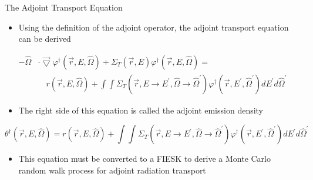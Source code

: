 \documentclass{beamer}
\begin{document}
\begin{frame}{The Adjoint Transport Equation}

  \begin{itemize}
    \item Using the definition of the adjoint operator, the adjoint transport 
      equation can be derived
  \end{itemize}
  
  \begin{equation*}
    \begin{split}
      -\hat{\Omega} &\cdot \vec{\bigtriangledown} 
      \varphi^{\dagger}(\vec{r},E,\hat{\Omega})
      + \Sigma_T(\vec{r},E) \varphi^{\dagger}(\vec{r},E,\hat{\Omega}) = \\
      & \quad r(\vec{r},E,\hat{\Omega}) +
      \int\int \Sigma_T(\vec{r},E \to E^{'},\hat{\Omega} \to \hat{\Omega}^{'})
      \varphi^{\dagger}(\vec{r},E^{'},\hat{\Omega}^{'}) dE^{'}d\hat{\Omega}^{'}
    \end{split}
  \end{equation*}

  \medskip

  \begin{itemize}
    \item The right side of this equation is called the adjoint emission density
  \end{itemize}
  \begin{equation*}
    \theta^{\dagger}(\vec{r},E,\hat{\Omega}) = r(\vec{r},E,\hat{\Omega}) +
    \int\int \Sigma_T(\vec{r},E \to E^{'},\hat{\Omega} \to \hat{\Omega}^{'})
    \varphi^{\dagger}(\vec{r},E^{'},\hat{\Omega}^{'}) dE^{'}d\hat{\Omega}^{'}
  \end{equation*}

  \begin{itemize}
    \item This equation must be converted to a FIESK to derive
      a Monte Carlo random walk process for adjoint radiation transport
  \end{itemize}
      
\end{frame}
\end{document}
